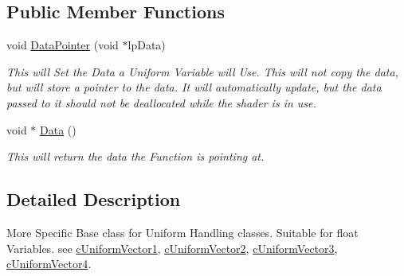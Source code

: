 \subsection*{Public Member Functions}
\begin{DoxyCompactItemize}
\item 
\hypertarget{classc_float_uniform_store_a95ff7fe17352d7da93382001706db97d}{
void \hyperlink{classc_float_uniform_store_a95ff7fe17352d7da93382001706db97d}{DataPointer} (void $\ast$lpData)}
\label{classc_float_uniform_store_a95ff7fe17352d7da93382001706db97d}

\begin{DoxyCompactList}\small\item\em This will Set the Data a Uniform Variable will Use. This will not copy the data, but will store a pointer to the data. It will automatically update, but the data passed to it should not be deallocated while the shader is in use. \end{DoxyCompactList}\item 
\hypertarget{classc_float_uniform_store_acdd11db6d22fbcd1005053c327fb93ba}{
void $\ast$ \hyperlink{classc_float_uniform_store_acdd11db6d22fbcd1005053c327fb93ba}{Data} ()}
\label{classc_float_uniform_store_acdd11db6d22fbcd1005053c327fb93ba}

\begin{DoxyCompactList}\small\item\em This will return the data the Function is pointing at. \end{DoxyCompactList}\end{DoxyCompactItemize}


\subsection{Detailed Description}
More Specific Base class for Uniform Handling classes. Suitable for float Variables. see \hyperlink{classc_uniform_vector1}{cUniformVector1}, \hyperlink{classc_uniform_vector2}{cUniformVector2}, \hyperlink{classc_uniform_vector3}{cUniformVector3}, \hyperlink{classc_uniform_vector4}{cUniformVector4}. 
